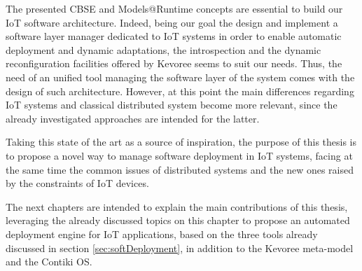 The presented CBSE and Models@Runtime concepts are essential to build our IoT software architecture.
Indeed, being our goal the design and implement a software layer manager dedicated to IoT systems in order to enable automatic deployment and dynamic adaptations, the introspection and the dynamic reconfiguration facilities offered by Kevoree seems to suit our needs.
Thus, the need of an unified tool managing the software layer of the system comes with the design of such architecture.
However, at this point the main differences regarding IoT systems and classical distributed system become more relevant, since the already investigated approaches are intended for the latter.

Taking this state of the art as a source of inspiration, the purpose of this thesis is to propose a novel way to manage software deployment in IoT systems, facing at the same time the common issues of distributed systems and the new ones raised by the constraints of IoT devices.

The next chapters are intended to explain the main contributions of this thesis, leveraging the already discussed topics on this chapter to propose an automated deployment engine for IoT applications, based on the three tools already discussed in section \ref{sec:softDeployment}, in addition to the Kevoree meta-model and the Contiki OS.